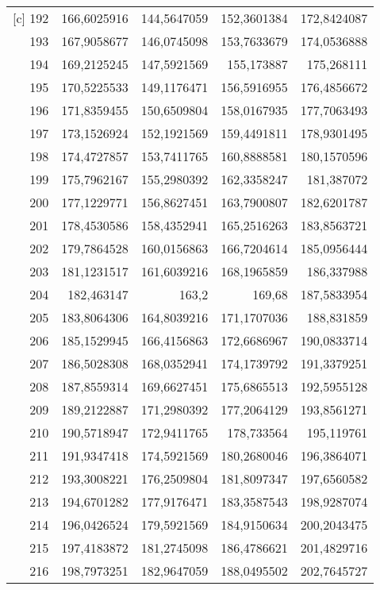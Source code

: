 \begin{longtable}{r|rrrr}[c]
    192   & 166,6025916 & 144,5647059 & 152,3601384 & 172,8424087 \\
    193   & 167,9058677 & 146,0745098 & 153,7633679 & 174,0536888 \\
    194   & 169,2125245 & 147,5921569 & 155,173887 & 175,268111 \\
    195   & 170,5225533 & 149,1176471 & 156,5916955 & 176,4856672 \\
    196   & 171,8359455 & 150,6509804 & 158,0167935 & 177,7063493 \\
    197   & 173,1526924 & 152,1921569 & 159,4491811 & 178,9301495 \\
    198   & 174,4727857 & 153,7411765 & 160,8888581 & 180,1570596 \\
    199   & 175,7962167 & 155,2980392 & 162,3358247 & 181,387072 \\
    200   & 177,1229771 & 156,8627451 & 163,7900807 & 182,6201787 \\
    201   & 178,4530586 & 158,4352941 & 165,2516263 & 183,8563721 \\
    202   & 179,7864528 & 160,0156863 & 166,7204614 & 185,0956444 \\
    203   & 181,1231517 & 161,6039216 & 168,1965859 & 186,337988 \\
    204   & 182,463147 & 163,2 & 169,68 & 187,5833954 \\
    205   & 183,8064306 & 164,8039216 & 171,1707036 & 188,831859 \\
    206   & 185,1529945 & 166,4156863 & 172,6686967 & 190,0833714 \\
    207   & 186,5028308 & 168,0352941 & 174,1739792 & 191,3379251 \\
    208   & 187,8559314 & 169,6627451 & 175,6865513 & 192,5955128 \\
    209   & 189,2122887 & 171,2980392 & 177,2064129 & 193,8561271 \\
    210   & 190,5718947 & 172,9411765 & 178,733564 & 195,119761 \\
    211   & 191,9347418 & 174,5921569 & 180,2680046 & 196,3864071 \\
    212   & 193,3008221 & 176,2509804 & 181,8097347 & 197,6560582 \\
    213   & 194,6701282 & 177,9176471 & 183,3587543 & 198,9287074 \\
    214   & 196,0426524 & 179,5921569 & 184,9150634 & 200,2043475 \\
    215   & 197,4183872 & 181,2745098 & 186,4786621 & 201,4829716 \\
    216   & 198,7973251 & 182,9647059 & 188,0495502 & 202,7645727 \\

\end{longtable}
